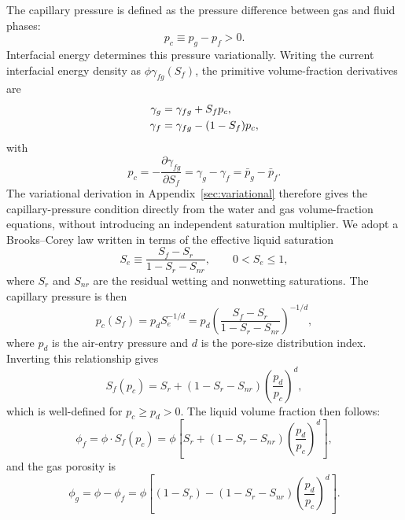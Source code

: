\documentclass[11pt]{article}
\begin{document}
The capillary pressure is defined as the pressure difference between gas and fluid phases:
\begin{equation}
p_c \equiv p_g - p_f > 0.
\label{eq:pc_def_main}
\end{equation}
Interfacial energy determines this pressure variationally.  Writing the current
interfacial energy density as $\phi\gamma_{fg}(S_f)$, the primitive
volume-fraction derivatives are
\begin{align}
  \gamma_g &= \gamma_{fg}+S_f p_c, \notag\\
  \gamma_f &= \gamma_{fg}-(1-S_f)p_c,
\end{align}
with
\begin{equation}
  p_c = -\frac{\partial\gamma_{fg}}{\partial S_f}
      = \gamma_g-\gamma_f
      = \bar p_g-\bar p_f .
\end{equation}
The variational derivation in Appendix~\ref{sec:variational} therefore gives
the capillary-pressure condition directly from the water and gas
volume-fraction equations, without introducing an independent saturation
multiplier. We adopt a Brooks--Corey law written in terms of the effective liquid saturation
\begin{equation}
S_e \equiv \frac{S_f-S_r}{1-S_r-S_{nr}},
\qquad 0 < S_e \le 1,
\end{equation}
where $S_r$ and $S_{nr}$ are the residual wetting and nonwetting saturations. The capillary pressure is then
\begin{equation}
p_c(S_f) = p_d S_e^{-1/d} = p_d\left(\frac{S_f-S_r}{1-S_r-S_{nr}}\right)^{-1/d},
\label{eq:brooks_corey}
\end{equation}
where $p_d$ is the air-entry pressure and $d$ is the pore-size distribution index. Inverting this relationship gives
\begin{equation}
S_f(p_c) = S_r + (1-S_r-S_{nr})\left(\frac{p_d}{p_c}\right)^d,
\label{eq:Sf_of_pc}
\end{equation}
which is well-defined for $p_c \ge p_d > 0$. The liquid volume fraction then follows:
\begin{equation}
\phi_f = \phi \cdot S_f(p_c) = \phi\left[S_r + (1-S_r-S_{nr})\left(\frac{p_d}{p_c}\right)^d\right],
\label{eq:phi_f_of_pc}
\end{equation}
and the gas porosity is
\begin{equation}
\phi_g = \phi - \phi_f = \phi\left[(1-S_r) - (1-S_r-S_{nr})\left(\frac{p_d}{p_c}\right)^d\right].
\label{eq:phi_g_of_pc}
\end{equation}
\end{document}

